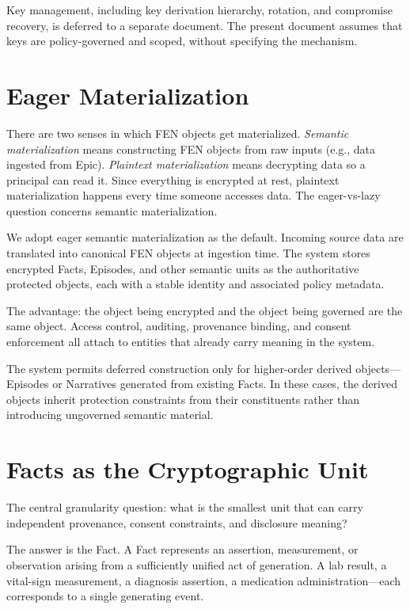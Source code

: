 \documentclass[11pt]{article}
\begin{document}
Key management, including key derivation hierarchy, rotation, and
compromise recovery, is deferred to a separate document. The present
document assumes that keys are policy-governed and scoped, without
specifying the mechanism.

\section{Eager Materialization}

There are two senses in which FEN objects get materialized.
\emph{Semantic materialization} means constructing FEN objects from raw
inputs (e.g., data ingested from Epic). \emph{Plaintext materialization}
means decrypting data so a principal can read it. Since everything is
encrypted at rest, plaintext materialization happens every time someone
accesses data. The eager-vs-lazy question concerns semantic
materialization.

We adopt eager semantic materialization as the default. Incoming source
data are translated into canonical FEN objects at ingestion time. The
system stores encrypted Facts, Episodes, and other semantic units as the
authoritative protected objects, each with a stable identity and
associated policy metadata.

The advantage: the object being encrypted and the object being governed
are the same object. Access control, auditing, provenance binding, and
consent enforcement all attach to entities that already carry meaning in
the system.

The system permits deferred construction only for higher-order derived
objects---Episodes or Narratives generated from existing Facts. In these
cases, the derived objects inherit protection constraints from their
constituents rather than introducing ungoverned semantic material.

\section{Facts as the Cryptographic Unit}

The central granularity question: what is the smallest unit that can
carry independent provenance, consent constraints, and disclosure
meaning?

The answer is the Fact. A Fact represents an assertion, measurement, or
observation arising from a sufficiently unified act of generation. A lab
result, a vital-sign measurement, a diagnosis assertion, a medication
administration---each corresponds to a single generating event.
\end{document}

